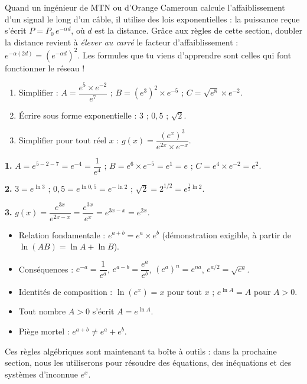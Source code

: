 \documentclass[11pt]{article}
\begin{document}
\begin{savaistu}
Quand un ingénieur de MTN ou d'Orange Cameroun calcule l'affaiblissement d'un signal le long d'un câble, il utilise des lois exponentielles : la puissance reçue s'écrit $P = P_0 \, e^{-\alpha d}$, où $d$ est la distance. Grâce aux règles de cette section, doubler la distance revient à \emph{élever au carré} le facteur d'affaiblissement : $e^{-\alpha (2d)} = \left(e^{-\alpha d}\right)^{2}$. Les formules que tu viens d'apprendre sont celles qui font fonctionner le réseau !
\end{savaistu}

\begin{exercice}
\begin{enumerate}
\item Simplifier : $A = \dfrac{e^{5} \times e^{-2}}{e^{7}}$ ; \quad $B = \left(e^{3}\right)^{2} \times e^{-5}$ ; \quad $C = \sqrt{e^{8}} \times e^{-2}$.
\item Écrire sous forme exponentielle : $3$ ; \quad $0{,}5$ ; \quad $\sqrt{2}$.
\item Simplifier pour tout réel $x$ : $g(x) = \dfrac{\left(e^{x}\right)^{3}}{e^{2x} \times e^{-x}}$.
\end{enumerate}
\end{exercice}

\begin{corrige}
\textbf{1.} $A = e^{5-2-7} = e^{-4} = \dfrac{1}{e^{4}}$ ; \quad $B = e^{6} \times e^{-5} = e^{1} = e$ ; \quad $C = e^{4} \times e^{-2} = e^{2}$.

\textbf{2.} $3 = e^{\ln 3}$ ; \quad $0{,}5 = e^{\ln 0{,}5} = e^{-\ln 2}$ ; \quad $\sqrt{2} = 2^{1/2} = e^{\frac{1}{2}\ln 2}$.

\textbf{3.} $g(x) = \dfrac{e^{3x}}{e^{2x - x}} = \dfrac{e^{3x}}{e^{x}} = e^{3x - x} = e^{2x}$.
\end{corrige}

\begin{aretenir}
\begin{itemize}
\item Relation fondamentale : $e^{a+b} = e^a \times e^b$ (démonstration exigible, à partir de $\ln(AB) = \ln A + \ln B$).
\item Conséquences : $e^{-a} = \dfrac{1}{e^a}$, \; $e^{a-b} = \dfrac{e^a}{e^b}$, \; $\left(e^a\right)^n = e^{na}$, \; $e^{a/2} = \sqrt{e^a}$.
\item Identités de composition : $\ln(e^x) = x$ pour tout $x$ ; $e^{\ln A} = A$ pour $A > 0$.
\item Tout nombre $A > 0$ s'écrit $A = e^{\ln A}$.
\item Piège mortel : $e^{a+b} \neq e^a + e^b$.
\end{itemize}
Ces règles algébriques sont maintenant ta boîte à outils : dans la prochaine section, nous les utiliserons pour résoudre des équations, des inéquations et des systèmes d'inconnue $e^x$.
\end{aretenir}
\end{document}
